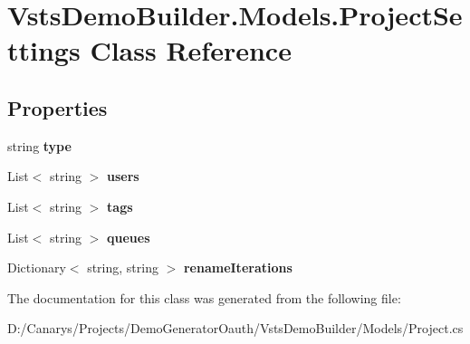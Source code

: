 \hypertarget{class_vsts_demo_builder_1_1_models_1_1_project_settings}{}\section{Vsts\+Demo\+Builder.\+Models.\+Project\+Settings Class Reference}
\label{class_vsts_demo_builder_1_1_models_1_1_project_settings}
\subsection*{Properties}
\begin{DoxyCompactItemize}
\item 
\mbox{\label{class_vsts_demo_builder_1_1_models_1_1_project_settings_a999a942bda5892828a654da33c06ebd7}} 
string {\bfseries type}
\item 
\mbox{\label{class_vsts_demo_builder_1_1_models_1_1_project_settings_aec56e0cb72c447475a52b78c6bb71586}} 
List$<$ string $>$ {\bfseries users}
\item 
\mbox{\label{class_vsts_demo_builder_1_1_models_1_1_project_settings_a416eb8213fd93fdc0ebf34b0bc1d7090}} 
List$<$ string $>$ {\bfseries tags}
\item 
\mbox{\label{class_vsts_demo_builder_1_1_models_1_1_project_settings_a697265f3a72e96c3ec57840c428264fb}} 
List$<$ string $>$ {\bfseries queues}
\item 
\mbox{\label{class_vsts_demo_builder_1_1_models_1_1_project_settings_a65bb397817b7799fa88acd0f882ffc17}} 
Dictionary$<$ string, string $>$ {\bfseries rename\+Iterations}
\end{DoxyCompactItemize}


The documentation for this class was generated from the following file\+:\begin{DoxyCompactItemize}
\item 
D\+:/\+Canarys/\+Projects/\+Demo\+Generator\+Oauth/\+Vsts\+Demo\+Builder/\+Models/Project.\+cs\end{DoxyCompactItemize}
